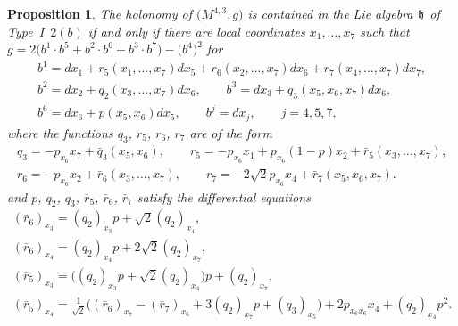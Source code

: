 \documentclass[11pt]{article}
\numberwithin{equation}{section}
\newtheorem{Proposition}[Theorem]{Proposition}
 { \theoremstyle{definition}
\newtheorem{Definition}[Theorem]{Definition}
\newtheorem{Example}[Theorem]{Example}
\newtheorem{Remark}[Theorem]{Remark} }
\newcommand\fh{{\frak h}}
\begin{document}
\begin{Proposition} \label{prop2.2} The holonomy of $\big(M^{4,3},g\big)$ is contained in the Lie algebra $\fh$ of Type~I~$2(b)$ if and only if there are local coordinates $x_1,\dots,x_7$ such that $g=2\big(b^1\cdot b^5+b^2\cdot b^6+b^3\cdot b^7\big)- \big(b^4\big)^2$ for
\begin{gather}
b^1 = dx_1+r_5(x_1,\dots,x_7)dx_5+r_6(x_2,\dots,x_7)dx_6+r_7(x_4,\dots,x_7)dx_7, \nonumber \\
b^2 =dx_2+ q_2(x_3,\dots,x_7)dx_6, \qquad b^3 =dx_3+ q_3(x_5,x_6,x_7)dx_6, \label{Eb}\\
b^6 =dx_6+p(x_5,x_6)dx_5, \qquad b^j =dx_j, \qquad j=4,5,7, \nonumber
\end{gather}
where the functions $q_3$, $r_5$, $r_6$, $r_7$ are of the form
\begin{gather*}
q_3= -p_{x_6}x_7+\bar q_3(x_5,x_6),\qquad
r_5= -p_{x_6} x_1 +p_{x_6}(1-p)x_2+\bar r_5(x_3,\dots,x_7),\\
r_6= -p_{x_6}x_2 +\bar r_6(x_3,\dots, x_7),\qquad
r_7= -2\sqrt2 p_{x_6}x_4 +\bar r_7(x_5,x_6,x_7).
\end{gather*}
and $p$, $q_2$, $q_3$, $\bar r_5$, $\bar r_6$, $\bar r_7$ satisfy the differential equations
\begin{gather}
(\bar r_6)_{x_3}= (q_2)_{x_3}p+ {\sqrt2}(q_2)_{x_4}, \label{Esysta}\\
(\bar r_6)_{x_4}=(q_2)_{x_4}p+2\sqrt 2(q_2)_{x_7},\label{Esyst2}\\
(\bar r_5)_{x_3} =\big((q_2)_{x_3}p+ {\sqrt2}(q_2)_{x_4}\big)p+ (q_2)_{x_7}, \label{Esyst3}\\
(\bar r_5)_{x_4}= \tfrac 1{\sqrt2} \big((\bar r_6)_{x_7} - (\bar r_7)_{x_6} +3 (q_2)_{x_7}p +(q_3)_{x_5}\big) +2p_{x_6 x_6} x_4 +(q_2)_{x_4} p^2.\label{Esyste}
\end{gather}
\end{Proposition}
\end{document}
